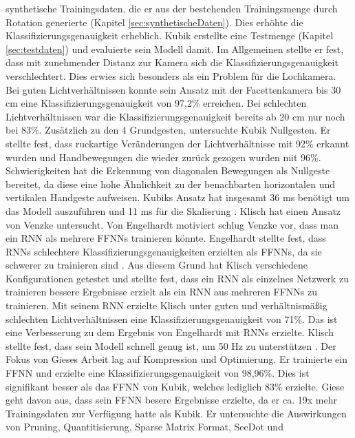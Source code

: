 synthetische Trainingsdaten, die er aus der bestehenden Trainingsmenge durch Rotation generierte (Kapitel \ref{sec:synthetischeDaten}). Dies erhöhte die Klassifizierungsgenauigkeit erheblich. Kubik erstellte eine Testmenge
(Kapitel \ref{sec:testdaten}) und evaluierte sein Modell damit. Im Allgemeinen stellte er fest, dass mit zunehmender Distanz zur Kamera sich die Klassifizierungsgenauigkeit verschlechtert. Dies erwies sich besonders als ein
Problem für die Lochkamera. Bei guten Lichtverhältnissen konnte sein Ansatz mit der Facettenkamera bis 30 cm eine Klassifizierungsgenauigkeit von 97,2\% erreichen. Bei schlechten Lichtverhältnissen war die Klassifizierungsgenauigkeit
bereits ab 20 cm nur noch bei 83\%. Zusätzlich zu den 4 Grundgesten, untersuchte Kubik Nullgesten. Er stellte fest, dass ruckartige Veränderungen der Lichtverhältnisse mit 92\% erkannt wurden und Handbewegungen die wieder
zurück gezogen wurden mit 96\%. Schwierigkeiten hat die Erkennung von diagonalen Bewegungen als Nullgeste bereitet, da diese eine hohe Ähnlichkeit zu der benachbarten horizontalen und vertikalen Handgeste aufweisen. Kubiks Ansatz
hat insgesamt 36 ms benötigt um das Modell auszuführen und 11 ms für die Skalierung \cite{kubikThesis}.
\newline
\newline
Klisch hat einen Ansatz von Venzke untersucht. Von Engelhardt motiviert schlug Venzke vor, dass man ein RNN als mehrere FFNNs trainieren könnte. Engelhardt stellte fest, dass RNNs schlechtere
Klassifizierungsgenauigkeiten erzielten als FFNNs, da sie schwerer zu trainieren sind \cite{engelhardtThesis}. Aus diesem Grund hat Klisch verschiedene Konfigurationen getestet und stellte fest,
dass ein RNN als einzelnes Netzwerk zu trainieren bessere Ergebnisse erzielt als ein RNN aus mehreren FFNNs zu trainieren. Mit seinem RNN erzielte Klisch unter guten und verhältnismäßig
schlechten Lichtverhältnissen eine Klassifizierungsgenauigkeit von 71\%. Das ist eine Verbesserung zu dem Ergebnis von Engelhardt mit RNNs erzielte.
Klisch stellte fest, dass sein Modell schnell genug ist, um 50 Hz zu unterstützen \cite{klischThesis}.
\newline
\newline
Der Fokus von Gieses Arbeit lag auf Kompression und Optimierung. Er trainierte ein FFNN und erzielte eine Klassifizierungsgenauigkeit von 98,96\%. Dies ist signifikant besser als das FFNN von Kubik, welches lediglich 83\% erzielte.
Giese geht davon aus, dass sein FFNN besere Ergebnisse erzielte, da er ca. 19x mehr Trainingsdaten zur Verfügung hatte als Kubik. Er untersuchte die Auswirkungen von Pruning, Quantitisierung, Sparse Matrix Format, SeeDot und
